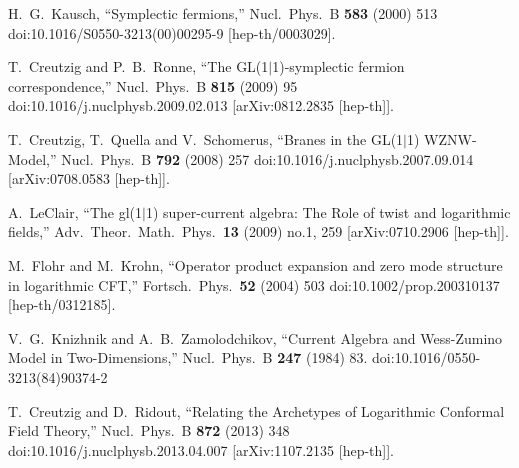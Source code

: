 \documentclass[12pt]{article}
\numberwithin{equation}{section}
\numberwithin{equation}{section}
\numberwithin{table}{section}\setlength{\multlinegap}{25pt}
\begin{document}
\begin{thebibliography}{99}
  H.~G.~Kausch,
  ``Symplectic fermions,''
  Nucl.\ Phys.\ B {\bf 583} (2000) 513
  doi:10.1016/S0550-3213(00)00295-9
  [hep-th/0003029].

  T.~Creutzig and P.~B.~Ronne,
  ``The GL(1$|$1)-symplectic fermion correspondence,''
  Nucl.\ Phys.\ B {\bf 815} (2009) 95
  doi:10.1016/j.nuclphysb.2009.02.013
  [arXiv:0812.2835 [hep-th]].


  T.~Creutzig, T.~Quella and V.~Schomerus,
  ``Branes in the GL(1$|$1) WZNW-Model,''
  Nucl.\ Phys.\ B {\bf 792} (2008) 257
  doi:10.1016/j.nuclphysb.2007.09.014
  [arXiv:0708.0583 [hep-th]].


  A.~LeClair,
  ``The gl(1$|$1) super-current algebra: The Role of twist and logarithmic fields,''
  Adv.\ Theor.\ Math.\ Phys.\  {\bf 13} (2009) no.1,  259
  [arXiv:0710.2906 [hep-th]].


  M.~Flohr and M.~Krohn,
  ``Operator product expansion and zero mode structure in logarithmic CFT,''
  Fortsch.\ Phys.\  {\bf 52} (2004) 503
  doi:10.1002/prop.200310137
  [hep-th/0312185].


  V.~G.~Knizhnik and A.~B.~Zamolodchikov,
  ``Current Algebra and Wess-Zumino Model in Two-Dimensions,''
  Nucl.\ Phys.\ B {\bf 247} (1984) 83.
  doi:10.1016/0550-3213(84)90374-2

  T.~Creutzig and D.~Ridout,
  ``Relating the Archetypes of Logarithmic Conformal Field Theory,''
  Nucl.\ Phys.\ B {\bf 872} (2013) 348
  doi:10.1016/j.nuclphysb.2013.04.007
  [arXiv:1107.2135 [hep-th]].


\end{thebibliography}
\end{document}
